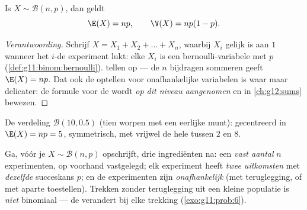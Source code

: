 \begin{proposition}\label{prop:g11:binom:expectation}
Is $X \sim \mathcal B(n, p)$, dan geldt
\[
\E(X) = np,
\qquad
\V(X) = np(1-p).
\]
\end{proposition}

\begin{proof}[Verantwoording]
Schrijf $X = X_1 + X_2 + \dots + X_n$, waarbij $X_i$ gelijk is aan $1$
wanneer het $i$-de experiment lukt: elke $X_i$ is een bernoulli-variabele met
 $p$ (\cref{def:g11:binom:bernoulli}).  tellen op
--- de $n$ bijdragen sommeren geeft $\E(X) = np$. Dat ook de
\emph{} optellen voor onafhankelijke variabelen is waar maar
delicater: de formule voor de  wordt \emph{op dit niveau aangenomen}
en in \cref{ch:g12:sums} bewezen.
\end{proof}

\begin{omfigure}

{\small De verdeling $\mathcal B(10, 0.5)$ (tien worpen met een eerlijke
munt): gecentreerd in $\E(X) = np = 5$, symmetrisch, met vrijwel de hele 
tussen $2$ en $8$.}
\end{omfigure}

\begin{method}\label{met:g11:binom:recognize}
Ga, vóór je $X \sim \mathcal B(n, p)$ opschrijft, drie ingrediënten na: een
\emph{vast aantal} $n$ experimenten, op voorhand vastgelegd; elk experiment
heeft \emph{twee uitkomsten} met \emph{dezelfde} succeskans $p$; en de
experimenten zijn \emph{onafhankelijk} (met teruglegging, of met aparte
toestellen). Trekken zonder teruglegging uit een kleine populatie is
\emph{niet} binomiaal --- de  verandert bij elke trekking
(\cref{exo:g11:prob:6}).
\end{method}

